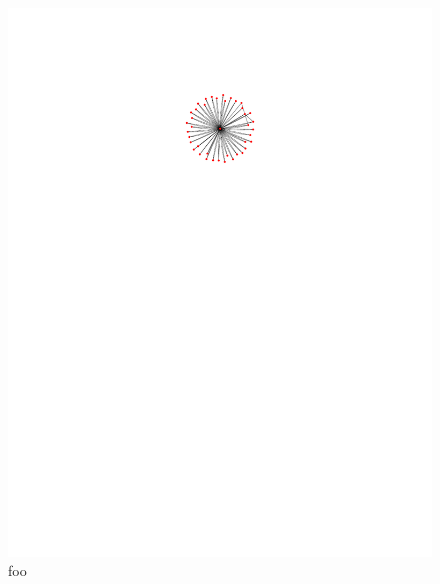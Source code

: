 \begin{figure}[h]
  \centering
  \includegraphics[scale=1.0]{images/label-subgraph-41-star-c222345bc5eb1f9eff80d58a81861974.pdf}
  \caption{foo}
  \label{fig:time-corr-com-star}
\end{figure}

